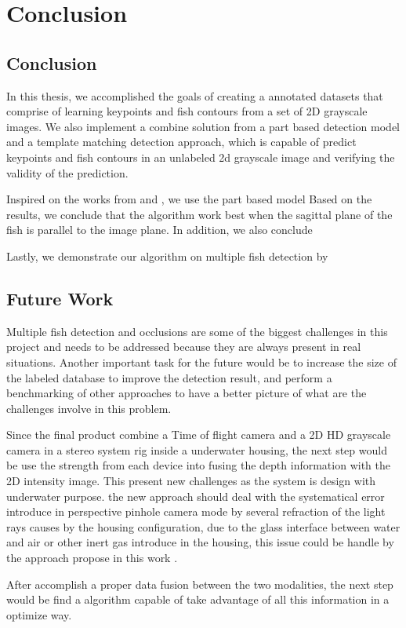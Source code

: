 \chapter{Conclusion}
\label{chapter:Conclusion}


\section{Conclusion}
In this thesis, we accomplished  the goals of creating a annotated datasets that
comprise of learning keypoints and fish contours from a set of 2D grayscale images.
We also implement a combine solution from a part based detection model and a template
matching detection approach, which is capable of predict keypoints and fish contours in an 
unlabeled 2d grayscale image and verifying the validity of the prediction.


Inspired on the works from \citet{Ramanan2012} and \citet{Hinterstoisser2012}, we 
use the part based model
Based on the results, we conclude that the algorithm work best when the sagittal plane
of the fish is parallel to the image plane. In addition, we also conclude 

Lastly, we demonstrate our algorithm on multiple fish detection by 

\section{Future Work}
Multiple fish detection and occlusions are some of the biggest challenges in this
project and needs to be addressed because they are always present in real situations.
Another important task for the future would be to increase the size of the labeled database
to improve the detection result, and perform a benchmarking of other approaches to
have a better picture of what are the challenges involve in this problem.

Since the final product combine a Time of flight camera and a 2D HD grayscale camera in a
stereo system rig inside a underwater housing, the next step would be use the strength
from each device into fusing the depth information with the 2D intensity image.
This present new challenges as the system is design with underwater purpose. the new approach
should deal with the systematical error introduce in perspective pinhole camera mode by several
refraction of the light rays causes by the housing configuration, due to the glass interface
between water and air or other inert gas introduce in the housing, this issue could be
handle by the approach propose in this work \citet{Sedlazeck2011}.

After accomplish a proper data fusion between the two modalities, the next step
would be find a algorithm capable of take advantage of all this information in a 
optimize way.


